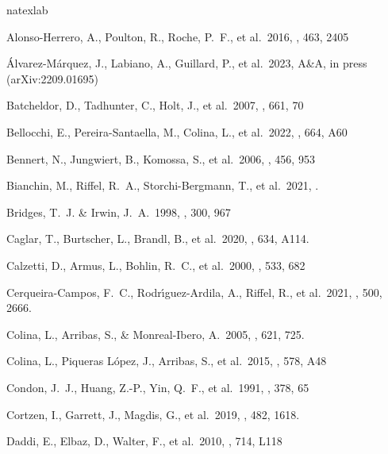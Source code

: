 \documentclass{aa}
\begin{document}
\begin{thebibliography}
\expandafter\ifx\csname natexlab\endcsname\relax\def\natexlab#1{#1}\fi


 Alonso-Herrero, A., Poulton, R., Roche, P.~F., et al.\ 2016, \mnras, 463, 2405

 {\'A}lvarez-M{\'a}rquez, J., Labiano, A., Guillard, P., et al.\ 2023, A\&A, in press  (arXiv:2209.01695)


 Batcheldor, D., Tadhunter, C., Holt, J., et al.\ 2007, \apj, 661, 70


 Bellocchi, E., Pereira-Santaella, M., Colina, L., et al.\ 2022, \aap, 664, A60

 Bennert, N., Jungwiert, B., Komossa, S., et al.\ 2006, \aap, 456, 953

 Bianchin, M., Riffel, R.~A., Storchi-Bergmann, T., et al.\ 2021, \mnras. 

 Bridges, T.~J. \& Irwin, J.~A.\ 1998, \mnras, 300, 967

 Caglar, T., Burtscher, L., Brandl, B., et al.\ 2020, \aap, 634, A114.

 Calzetti, D., Armus, L., Bohlin, R.~C., et al.\ 2000, \apj, 533, 682

 Cerqueira-Campos, F.~C., Rodr{\'\i}guez-Ardila, A., Riffel, R., et al.\ 2021, \mnras, 500, 2666.

 Colina, L., Arribas, S., \& Monreal-Ibero, A.\ 2005, \apj, 621, 725. 

 Colina, L., Piqueras L{\'o}pez, J., Arribas, S., et al.\ 2015, \aap, 578, A48

 Condon, J.~J., Huang, Z.-P., Yin, Q.~F., et al.\ 1991, \apj, 378, 65

 Cortzen, I., Garrett, J., Magdis, G., et al.\ 2019, \mnras, 482, 1618. 

 Daddi, E., Elbaz, D., Walter, F., et al.\ 2010, \apjl, 714, L118


\end{thebibliography}
\end{document}
